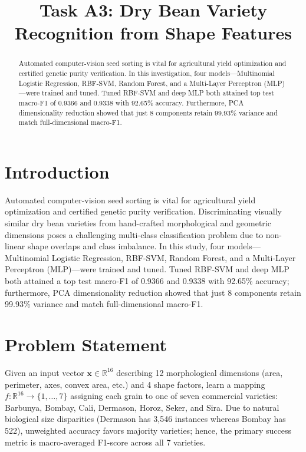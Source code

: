 \documentclass[conference]{IEEEtran}
\begin{document}
\title{Task A3: Dry Bean Variety Recognition from Shape Features}

\author{
}

\maketitle

\begin{abstract}
Automated computer-vision seed sorting is vital for agricultural yield optimization and certified genetic purity verification. In this investigation, four models—Multinomial Logistic Regression, RBF-SVM, Random Forest, and a Multi-Layer Perceptron (MLP)—were trained and tuned. Tuned RBF-SVM and deep MLP both attained top test macro-F1 of 0.9366 and 0.9338 with 92.65\% accuracy. Furthermore, PCA dimensionality reduction showed that just 8 components retain 99.93\% variance and match full-dimensional macro-F1.
\end{abstract}

\section{Introduction}
Automated computer-vision seed sorting is vital for agricultural yield optimization and certified genetic purity verification. Discriminating visually similar dry bean varieties from hand-crafted morphological and geometric dimensions poses a challenging multi-class classification problem due to non-linear shape overlaps and class imbalance. In this study, four models—Multinomial Logistic Regression, RBF-SVM, Random Forest, and a Multi-Layer Perceptron (MLP)—were trained and tuned. Tuned RBF-SVM and deep MLP both attained a top test macro-F1 of 0.9366 and 0.9338 with 92.65\% accuracy; furthermore, PCA dimensionality reduction showed that just 8 components retain 99.93\% variance and match full-dimensional macro-F1.

\section{Problem Statement}
Given an input vector $\mathbf{x} \in \mathbb{R}^{16}$ describing 12 morphological dimensions (area, perimeter, axes, convex area, etc.) and 4 shape factors, learn a mapping $f: \mathbb{R}^{16} \to \{1, \dots, 7\}$ assigning each grain to one of seven commercial varieties: Barbunya, Bombay, Cali, Dermason, Horoz, Seker, and Sira. Due to natural biological size disparities (Dermason has 3,546 instances whereas Bombay has 522), unweighted accuracy favors majority varieties; hence, the primary success metric is macro-averaged F1-score across all 7 varieties.
\end{document}
